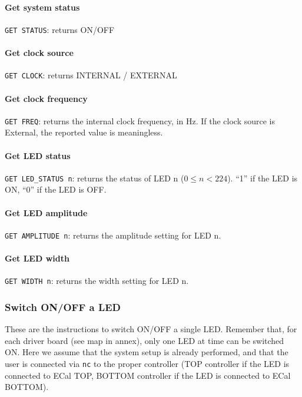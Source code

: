 \documentclass[12pt]{article}
\begin{document}
      \paragraph{Get system status}

      \texttt{GET STATUS}: returns ON/OFF

      \paragraph{Get clock source}

      \texttt{GET CLOCK}: returns INTERNAL / EXTERNAL

      \paragraph{Get clock frequency}

      \texttt{GET FREQ}: returns the internal clock frequency, in Hz. If the clock source is External, the reported value is meaningless.

      \paragraph{Get LED status}

      \texttt{GET LED\_STATUS n}: returns the status of LED n ($0\leq n<224$). ``1'' if the LED is ON, ``0'' if the LED is OFF.

      \paragraph{Get LED amplitude}

      \texttt{GET AMPLITUDE n}: returns the amplitude setting for LED n.

      \paragraph{Get LED width}

      \texttt{GET WIDTH n}: returns the width setting for LED n.

      \subsubsection{Switch ON/OFF a LED}

      These are the instructions to switch ON/OFF a single LED. Remember that, for each driver board (see map in annex), only one LED at time can be switched ON.
      Here we assume that the system setup is already performed, and that the user is connected via \texttt{nc} to the proper controller (TOP controller if the LED is connected to ECal TOP, BOTTOM controller if the LED is connected to ECal BOTTOM).
\end{document}
